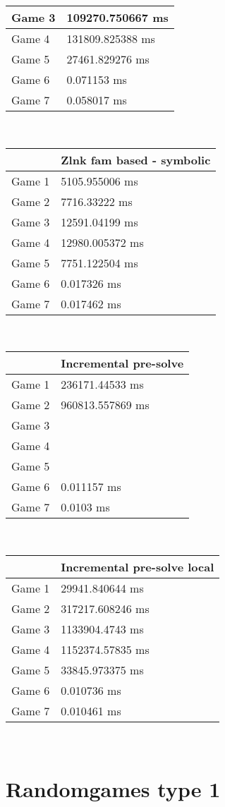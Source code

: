 \begin{multicols}{2}
\begin{tabular}{|l|l|}
	Game 3 & 109270.750667 ms \\ \hline
	Game 4 & 131809.825388 ms \\ \hline
	Game 5 & 27461.829276 ms \\ \hline
	Game 6 & 0.071153 ms \\ \hline
	Game 7 & 0.058017 ms \\ \hline
\end{tabular}\\
\begin{tabular}{|l|l|}
	\hline
	& Zlnk fam based - symbolic \\ \hline
	Game 1 & 5105.955006 ms \\ \hline
	Game 2 & 7716.33222 ms \\ \hline
	Game 3 & 12591.04199 ms \\ \hline
	Game 4 & 12980.005372 ms \\ \hline
	Game 5 & 7751.122504 ms \\ \hline
	Game 6 & 0.017326 ms \\ \hline
	Game 7 & 0.017462 ms \\ \hline
\end{tabular}\\
\begin{tabular}{|l|l|}
	\hline
	& Incremental pre-solve \\ \hline
	Game 1 & 236171.44533 ms \\ \hline
	Game 2 & 960813.557869 ms \\ \hline
	Game 3 & \dag \\ \hline
	Game 4 & \dag \\ \hline
	Game 5 & \dag \\ \hline
	Game 6 & 0.011157 ms \\ \hline
	Game 7 & 0.0103 ms \\ \hline
\end{tabular}\\
\begin{tabular}{|l|l|}
	\hline
	& Incremental pre-solve local \\ \hline
	Game 1 & 29941.840644 ms \\ \hline
	Game 2 & 317217.608246 ms \\ \hline
	Game 3 & 1133904.4743 ms \\ \hline
	Game 4 & 1152374.57835 ms \\ \hline
	Game 5 & 33845.973375 ms \\ \hline
	Game 6 & 0.010736 ms \\ \hline
	Game 7 & 0.010461 ms \\ \hline
\end{tabular}\\
\end{multicols}\pagebreak\section{Randomgames type 1}

